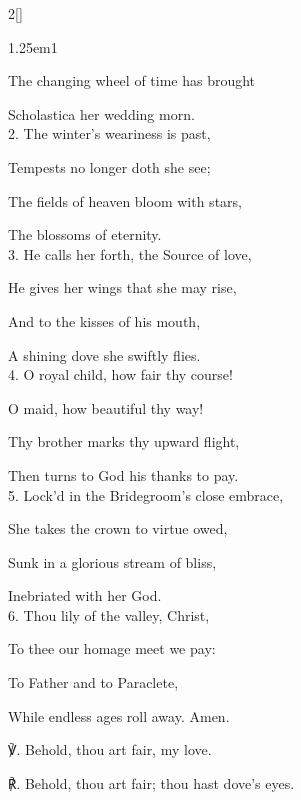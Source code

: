 \begin{paracol}{2}[]

\begin{hangparas}{1.25em}{1}

The changing wheel of time has brought

Scholastica her wedding morn.\\

2. The winter's weariness is past,

Tempests no longer doth she see;

The fields of heaven bloom with stars,

The blossoms of eternity.\\

3. He calls her forth, the Source of love,

He gives her wings that she may rise,

And to the kisses of his mouth,

A shining dove she swiftly flies.\\

4. O royal child, how fair thy course!

O maid, how beautiful thy way!

Thy brother marks thy upward flight,

Then turns to God his thanks to pay.\\

5. Lock'd in the Bridegroom's close embrace,

She takes the crown to virtue owed,

Sunk in a glorious stream of bliss,

Inebriated with her God.\\

6. Thou lily of the valley, Christ,

To thee our homage meet we pay:

To Father and to Paraclete,

While endless ages roll away. Amen.\\
\end{hangparas}

℣. Behold, thou art fair, my love.  

℟. Behold, thou art fair; thou hast dove's eyes.


\end{paracol}


